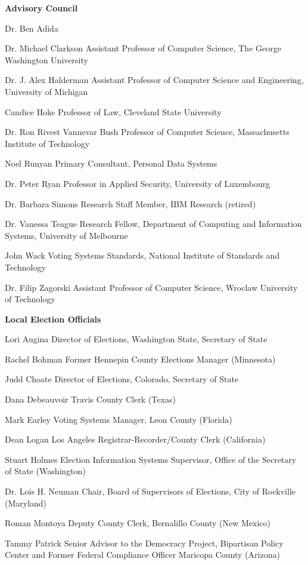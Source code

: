 \textbf{Advisory Council}

Dr. Ben Adida
 
Dr. Michael Clarkson
Assistant Professor of Computer Science, The George Washington University
 
Dr. J. Alex Halderman
Assistant Professor of Computer Science and Engineering, University of Michigan
 
Candice Hoke
Professor of Law, Cleveland State University
 
Dr. Ron Rivest
Vannevar Bush Professor of Computer Science, Massachusetts Institute of Technology
 
Noel Runyan
Primary Consultant, Personal Data Systems
 
Dr. Peter Ryan
Professor in Applied Security, University of Luxembourg
 
Dr. Barbara Simons
Research Staff Member, IBM Research (retired)
 
Dr. Vanessa Teague
Research Fellow, Department of Computing and Information Systems, University of Melbourne
 
John Wack
Voting Systems Standards, National Institute of Standards and Technology
 
Dr. Filip Zagorski
Assistant Professor of Computer Science, Wroclaw University of Technology
 
\textbf{Local Election Officials}

Lori Augina
Director of Elections, Washington State, Secretary of State

Rachel Bohman
Former Hennepin County Elections Manager (Minnesota)

Judd Choate
Director of Elections, Colorado, Secretary of State

Dana Debeauvoir
Travis County Clerk (Texas)
 
Mark Earley
Voting Systems Manager, Leon County (Florida)
 
Dean Logan
Los Angeles Registrar-Recorder/County Clerk (California)

Stuart Holmes
Election Information Systems Supervisor, Office of the Secretary of State (Washington)
 
Dr. Lois H. Neuman
Chair, Board of Supervisors of Elections, City of Rockville (Maryland)
 
Roman Montoya
Deputy County Clerk, Bernalillo County (New Mexico)
 
Tammy Patrick
Senior Advisor to the Democracy Project, Bipartisan Policy Center and Former Federal Compliance Officer Maricopa County (Arizona)
 
